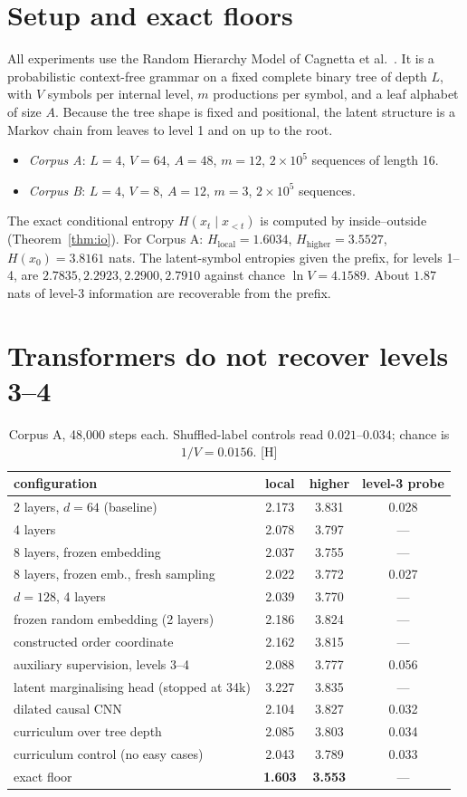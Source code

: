 \documentclass[11pt]{article}
\theoremstyle{definition}
\theoremstyle{remark}
\newcommand{\src}[1]{\textsf{\small[#1]}}
\begin{document}
\section{Setup and exact floors}

All experiments use the Random Hierarchy Model of Cagnetta et al.~\cite{cagnetta}. It is a probabilistic context-free grammar on a fixed complete binary tree of depth $L$, with $V$ symbols per internal level, $m$ productions per symbol, and a leaf alphabet of size $A$. Because the tree shape is fixed and positional, the latent structure is a Markov chain from leaves to level 1 and on up to the root.
\begin{itemize}
  \item \emph{Corpus A}: $L=4$, $V=64$, $A=48$, $m=12$, $2\times10^5$ sequences of length 16.
  \item \emph{Corpus B}: $L=4$, $V=8$, $A=12$, $m=3$, $2\times10^5$ sequences.
\end{itemize}
The exact conditional entropy $H(x_t\mid x_{<t})$ is computed by inside--outside (Theorem~\ref{thm:io}). For Corpus A: $H_{\text{local}}=1.6034$, $H_{\text{higher}}=3.5527$, $H(x_0)=3.8161$ nats. The latent-symbol entropies given the prefix, for levels 1--4, are $2.7835,2.2923,2.2900,2.7910$ against chance $\ln V=4.1589$. About $1.87$ nats of level-3 information are recoverable from the prefix.

\section{Transformers do not recover levels 3--4}
\begin{table}[h]\centering\small
\begin{tabular}{lccc}
\toprule
configuration & local & higher & level-3 probe\\
\midrule
2 layers, $d=64$ (baseline) & 2.173 & 3.831 & 0.028\\
4 layers & 2.078 & 3.797 & ---\\
8 layers, frozen embedding & 2.037 & 3.755 & ---\\
8 layers, frozen emb., fresh sampling & 2.022 & 3.772 & 0.027\\
$d=128$, 4 layers & 2.039 & 3.770 & ---\\
frozen random embedding (2 layers) & 2.186 & 3.824 & ---\\
constructed order coordinate & 2.162 & 3.815 & ---\\
auxiliary supervision, levels 3--4 & 2.088 & 3.777 & 0.056\\
latent marginalising head (stopped at 34k) & 3.227 & 3.835 & ---\\
dilated causal CNN & 2.104 & 3.827 & 0.032\\
curriculum over tree depth & 2.085 & 3.803 & 0.034\\
curriculum control (no easy cases) & 2.043 & 3.789 & 0.033\\
\midrule
exact floor & \textbf{1.603} & \textbf{3.553} & ---\\
\bottomrule
\end{tabular}
\caption{Corpus A, 48{,}000 steps each. Shuffled-label controls read $0.021$--$0.034$; chance is $1/V=0.0156$. \src{H}}
\end{table}
\end{document}
